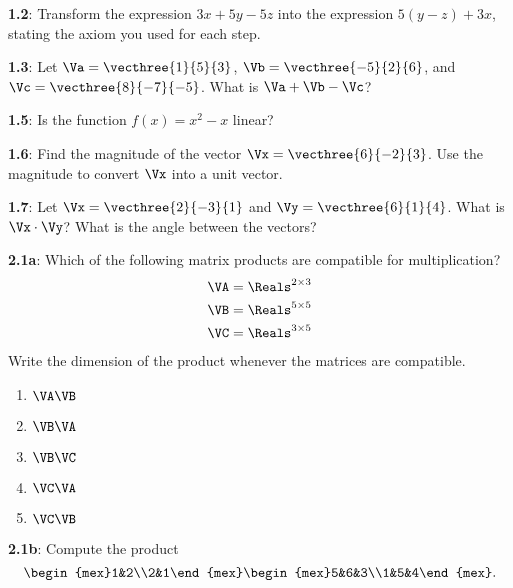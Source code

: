 \documentclass[pal,wide,12pt]{pajarticle}
\newenvironment{problem}[1]{\noindent\textbf{#1}:}{\newpage}
\begin{document}
\begin{problem}{1.2}
Transform the expression $3x + 5y - 5z$ into the expression $5(y-z) + 3x$, stating the axiom you used for each step.
\end{problem}


\begin{problem}{1.3}
Let	$\Va = \vecthree{1}{5}{3}$, $\Vb = \vecthree{-5}{2}{6}$, and $\Vc = \vecthree{8}{-7}{-5}$. What is $\Va + \Vb - \Vc$?
\end{problem}

\begin{problem}{1.5}
	Is the function $f(x) = x^2 - x$ linear?
\end{problem}

\begin{problem}{1.6}
	Find the magnitude of the vector $\Vx = \vecthree{6}{-2}{3}$. Use the magnitude to convert $\Vx$ into a unit vector.
\end{problem}

\begin{problem}{1.7}
	Let $\Vx = \vecthree{2}{-3}{1}$ and $\Vy = \vecthree{6}{1}{4}$. What is $\Vx\cdot\Vy$? What is the angle between the vectors?
\end{problem}

\begin{problem}{2.1a}
	Which of the following matrix products are compatible for multiplication?
	\begin{align*}
		\VA &= \Reals^{2\times3} \\
		\VB &= \Reals^{5\times5} \\
		\VC &= \Reals^{3\times5}	
	\end{align*}
Write the dimension of the product whenever the matrices are compatible.

\begin{enumerate}
	\item $\VA\VB$
	\item $\VB\VA$
	\item $\VB\VC$
	\item $\VC\VA$
	\item $\VC\VB$
\end{enumerate}
\end{problem}

\begin{problem}{2.1b}
	Compute the product
	\[ \begin{mex}1&2\\2&1\end{mex} \begin{mex}5&6&3\\1&5&4\end{mex}. \]
\end{problem}
\end{document}
